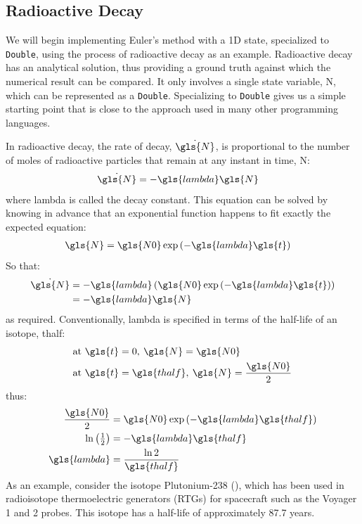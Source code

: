 \documentclass[12pt,openany]{book}
\newcommand{\code}[1]{\texttt{#1}}      %
\begin{document}
\subsection{Radioactive Decay}

We will begin implementing Euler's method with a 1D state, specialized to \code{Double}, using the process of radioactive decay as an example. Radioactive decay has an analytical solution, thus providing a ground truth against which the numerical result can be compared. It only involves a single state variable, \gls{N}, which can be represented as a \code{Double}. Specializing to \code{Double} gives us a simple starting point that is close to the approach used in many other programming languages.

In radioactive decay, the rate of decay, \(\dot{\gls{N}}\), is proportional to the number of moles of radioactive particles that remain at any instant in time, \gls{N}:
\begin{align}
  \dot{\gls{N}} &= -\gls{lambda}\gls{N}
\end{align}
where \gls{lambda} is called the decay constant. This equation can be solved by knowing in advance that an exponential function happens to fit exactly the expected equation:
\begin{align}
  \gls{N} &= \gls{N0} \exp\left({-\gls{lambda}\gls{t}}\right)
\end{align}
So that:
\begin{align}
  \dot{\gls{N}} &= -\gls{lambda}\left(\gls{N0}\exp\left({-\gls{lambda}\gls{t}}\right)\right) \\
                &= -\gls{lambda}\gls{N}
\end{align}
as required. Conventionally, \gls{lambda} is specified in terms of the half-life of an isotope, \gls{thalf}:
\begin{align}
  \textrm{at } \gls{t} &= 0,\: \gls{N} = \gls{N0} \\
  \textrm{at } \gls{t} &= \gls{thalf},\: \gls{N} = \frac{\gls{N0}}{2}
\end{align}
thus:
\begin{align}
  \frac{\gls{N0}}{2} &= \gls{N0}\exp\left({-\gls{lambda}\gls{thalf}}\right) \\
  \ln\left(\tfrac{1}{2}\right) &= -\gls{lambda}\gls{thalf} \\
  \gls{lambda} &= \frac{\ln 2}{\gls{thalf}}
\end{align}
As an example, consider the isotope Plutonium-238 (), which has been used in radioisotope thermoelectric generators (RTGs) for spacecraft such as the Voyager 1 and 2 probes. This isotope has a half-life of approximately 87.7 years.
\end{document}
